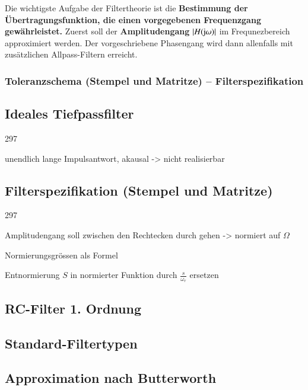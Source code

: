 Die wichtigste Aufgabe der Filtertheorie ist die \textbf{Bestimmung der Übertragungsfunktion, die einen vorgegebenen 
Frequenzgang gewährleistet.} Zuerst soll der \textbf{Amplitudengang} $| H(\mathrm{j} \omega) |$ im Frequnezbereich approximiert werden.
Der vorgeschriebene Phasengang wird dann allenfalls mit zusätzlichen Allpass-Filtern erreicht. 


\subsubsection{Toleranzschema (Stempel und Matritze) -- Filterspezifikation}



\subsection{Ideales Tiefpassfilter}{297}

unendlich lange Impulsantwort, akausal -> nicht realisierbar




\subsection{Filterspezifikation (Stempel und Matritze)}{297}

Amplitudengang soll zwischen den Rechtecken durch gehen
-> normiert auf $\Omega$

Normierungsgrössen als Formel

Entnormierung $S$ in normierter Funktion durch $\frac{s}{\omega_r}$ ersetzen

\subsection{RC-Filter 1. Ordnung}    %


\subsection{Standard-Filtertypen}



\subsection{Approximation nach Butterworth}
